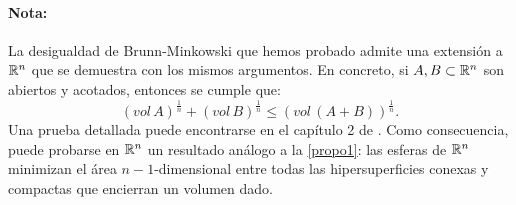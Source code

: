 \paragraph{Nota:} La desigualdad de Brunn-Minkowski que hemos probado admite una extensión a $\mathbb{R}^n$ que se demuestra con los mismos argumentos. En concreto, si $A,B \subset \mathbb{R}^n$ son abiertos y acotados, entonces se cumple que:
\begin{equation*}
    (vol \, A)^{\frac{1}{n}} + (vol \, B)^{\frac{1}{n}} \leq (vol \, (A+B))^{\frac{1}{n}}.
\end{equation*}
%
Una prueba detallada puede encontrarse en el capítulo 2 de \cite{geometricinequalities}.
Como consecuencia, puede probarse en $\mathbb{R}^n$ un resultado análogo a la \ref{propo1}: las esferas de $\mathbb{R}^n$ minimizan el área $n-1$-dimensional entre todas las hipersuperficies conexas y compactas que encierran un volumen dado.

